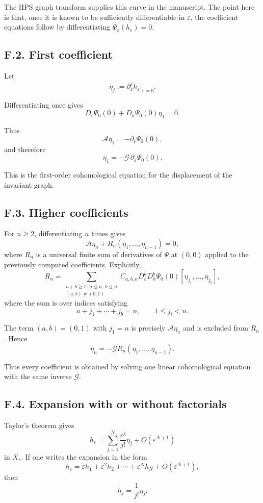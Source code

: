 \documentclass[12pt,a4paper]{article}
\theoremstyle{plain}
\numberwithin{equation}{section}
\numberwithin{theorem}{section}
\begin{document}
The HPS graph transform supplies this curve in the manuscript. The point here is that, once it is known to be sufficiently differentiable in $\varepsilon$, the coefficient equations follow by differentiating $\Psi_\varepsilon(h_\varepsilon)=0$.

\subsection{F.2. First coefficient}

Let
\[\eta_j:=\partial_\varepsilon^j h_\varepsilon|_{\varepsilon=0}.
\]

Differentiating once gives
\[
D_\varepsilon\Psi_0(0)+D_h\Psi_0(0)\eta_1=0.
\]

Thus
\[
\mathcal A\eta_1
=
-\partial_\varepsilon\Psi_0(0),
\]
and therefore
\[\eta_1
=
-
\mathcal G\,
\partial_\varepsilon\Psi_0(0).
\]

This is the first-order cohomological equation for the displacement of the invariant graph.

\subsection{F.3. Higher coefficients}

For $n\ge2$, differentiating $n$ times gives
\[
\mathcal A\eta_n+R_n(\eta_1,
\ldots,
\eta_{n-1})=0,
\]
where $R_n$ is a universal finite sum of derivatives of $\Psi$ at $(0,0)$ applied to the previously computed coefficients. Explicitly,
\[
R_n
=
\sum_{
\substack{a+b\ge1,\ a\le n,\ b\le n\\
(a,b)\ne(0,1)}}
C_{a,b,n}
D_\varepsilon^aD_h^b\Psi_0(0)
[\eta_{j_1},
\ldots,
\eta_{j_b}
],
\]
where the sum is over indices satisfying
\[
a+j_1+\cdots+j_b=n,
\qquad
1\le j_i<n.
\]

The term $(a,b)=(0,1)$ with $j_1=n$ is precisely $\mathcal A\eta_n$ and is excluded from $R_n$. Hence
\[\eta_n
=
-
\mathcal G R_n(\eta_1,
\ldots,
\eta_{n-1}).
\]

Thus every coefficient is obtained by solving one linear cohomological equation with the same inverse $\mathcal G$.

\subsection{F.4. Expansion with or without factorials}

Taylor's theorem gives
\[
h_\varepsilon
=
\sum_{j=1}^{N}
\frac{\varepsilon^j}{j!}
\eta_j
+O(\varepsilon^{N+1})
\]
in $X_r$. If one writes the expansion in the form
\[
h_\varepsilon
=
\varepsilon h_1+
\varepsilon^2 h_2+\cdots+
\varepsilon^N h_N
+O(\varepsilon^{N+1}),
\]
then
\[
h_j=\frac{1}{j!}\eta_j.
\]
\end{document}
